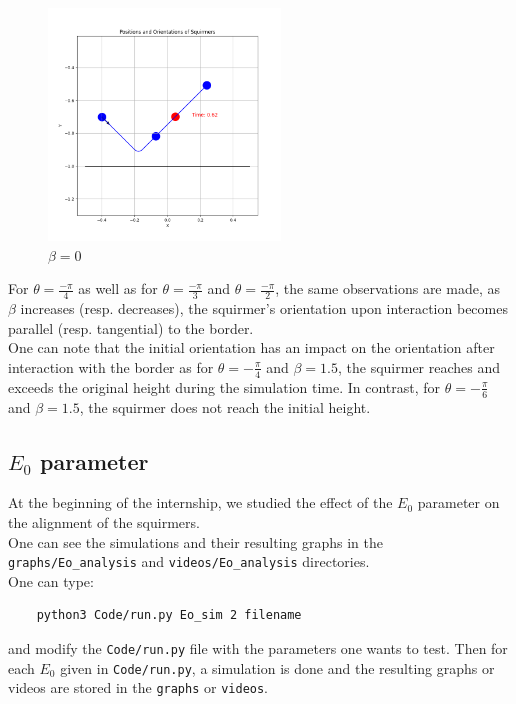 \documentclass{article}
\begin{document}
\begin{figure}[H]
    \centering
    \includegraphics[width=0.55\textwidth]{graphs/simulations/border/beta0/mpi_4.png}
    \caption{\footnotesize $\beta = 0$}
\end{figure}
For $\theta = \frac{-\pi}{4}$ as well as for $\theta = \frac{-\pi}{3}$ and $\theta = \frac{-\pi}{2}$, 
the same observations are made, as $\beta$ increases (resp. decreases), the squirmer's 
orientation upon interaction becomes parallel (resp. tangential) to the border.\\
One can note that the initial orientation has an impact on the orientation after interaction with the border as for $\theta = -\frac{\pi}{4}$ and 
$\beta = 1.5$, the squirmer reaches and exceeds the original height during the simulation time. In contrast, for $\theta = -\frac{\pi}{6}$ and 
$\beta = 1.5$, the squirmer does not reach the initial height.

\subsection{$E_0$ parameter}
At the beginning of the internship, we studied the effect of the $E_0$ parameter on the alignment of the squirmers.\\
One can see the simulations and their resulting graphs in the \texttt{graphs/Eo\_analysis} and \texttt{videos/Eo\_analysis} directories.\\
One can type:
\begin{verbatim}
    python3 Code/run.py Eo_sim 2 filename
\end{verbatim}
and modify the \texttt{Code/run.py} file with the parameters one wants to test.
 Then for each $E_0$ given in \texttt{Code/run.py}, 
 a simulation is done and the resulting graphs or videos are stored in the \texttt{graphs} or \texttt{videos}.\\
\end{document}
